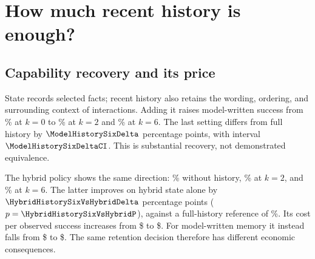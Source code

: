 \section{How much recent history is enough?}
\label{sec:capability}
\subsection{Capability recovery and its price}
State records selected facts; recent history also retains the wording,
ordering, and surrounding context of interactions. Adding it raises
model-written success from \ModelStateRate\% at $k=0$ to
\ModelHistoryTwoRate\% at $k=2$ and \ModelHistorySixRate\% at $k=6$.
The last setting differs from full history by
$\ModelHistorySixDelta$ percentage points, with interval
$\ModelHistorySixDeltaCI$. This is substantial recovery, not demonstrated
equivalence.

\begin{table}[htbp]
\centering\small
\caption{Recent-history retention, quality and economics. All retained
outcomes contribute. Each memory family has its own full-history control.
Cost ratio is the median matched ratio, not a ratio of medians; unavailable
hybrid ratios are left blank. Solved/\$ uses aggregate cost, including failures.}
\label{tab:history}
\resizebox{\linewidth}{!}{}
\end{table}

\begin{table}[htbp]
\centering\small
\caption{Resource panel for the same history policies. Peak prompt and
token counts are execution-level medians; cache hit is the median
within-execution cached fraction. Hybrid peak and cache-hit statistics
are unavailable, not zero.}
\label{tab:history-resources}
\resizebox{\linewidth}{!}{}
\end{table}

The hybrid policy shows the same direction: \HybridRate\% without history,
\HybridHistoryTwoRate\% at $k=2$, and \HybridHistorySixRate\% at $k=6$.
The latter improves on hybrid state alone by
$\HybridHistorySixVsHybridDelta$ percentage points
($p=\HybridHistorySixVsHybridP$), against a full-history reference of
\HybridControlRate\%.
Its cost per observed success increases from \$\HybridCostPerSuccess{}
to \$\HybridHistorySixCostPerSuccess{}.
For model-written memory it instead falls from
\$\ModelStateCostPerSuccess{} to \$\ModelHistorySixCostPerSuccess{}.
The same retention decision therefore has different economic consequences.

